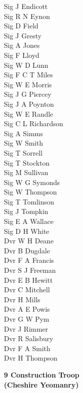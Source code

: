 \begin{multicols}{3}
  Sig J Endicott \\
  Sig R N Eynon \\
  Sig D Field \\
  Sig J Gresty \\
  Sig A Jones \\
  Sig F Lloyd \\
  Sig W D Lunn \\
  Sig F C T Miles \\
  Sig W E Morris \\
  Sig J G Piercey \\
  Sig J A Poynton \\
  Sig W E Randle \\
  Sig C L Richardson \\
  Sig A Simms \\
  Sig W Smith \\
  Sig T Sorrell \\
  Sig T Stockton \\
  Sig M Sullivan \\
  Sig W G Symonds \\
  Sig W Thompson \\
  Sig T Tomlinson \\
  Sig J Tompkin \\
  Sig E A Wallace \\
  Sig D H White \\
  Dvr W H Deane \\
  Dvr B Dugdale \\
  Dvr F A Francis \\
  Dvr S J Freeman \\
  Dvr E B Hewitt \\
  Dvr C Mitchell \\
  Dvr H Mills \\
  Dvr A E Powis \\
  Dvr G W Pym \\
  Dvr J Rimmer \\
  Dvr R Salisbury \\
  Dvr F A Smith \\
  Dvr H Thompson \\
\end{multicols}

\vspace*{10mm}

\pagebreak

\begin{center}
  \Large
  \textbf{9 Construction Troop \\ (Cheshire Yeomanry)}
\end{center}

